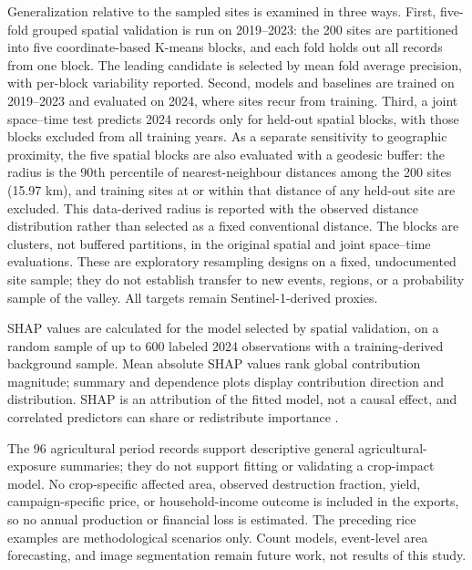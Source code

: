 \documentclass[pdflatex,sn-mathphys,Numbered]{sn-jnl}
\begin{document}
Generalization relative to the sampled sites is examined in three ways. First, five-fold grouped spatial validation is run on 2019--2023: the 200 sites are partitioned into five coordinate-based K-means blocks, and each fold holds out all records from one block. The leading candidate is selected by mean fold average precision, with per-block variability reported. Second, models and baselines are trained on 2019--2023 and evaluated on 2024, where sites recur from training. Third, a joint space--time test predicts 2024 records only for held-out spatial blocks, with those blocks excluded from all training years. As a separate sensitivity to geographic proximity, the five spatial blocks are also evaluated with a geodesic buffer: the radius is the 90th percentile of nearest-neighbour distances among the 200 sites (15.97 km), and training sites at or within that distance of any held-out site are excluded. This data-derived radius is reported with the observed distance distribution rather than selected as a fixed conventional distance. The blocks are clusters, not buffered partitions, in the original spatial and joint space--time evaluations. These are exploratory resampling designs on a fixed, undocumented site sample; they do not establish transfer to new events, regions, or a probability sample of the valley. All targets remain Sentinel-1-derived proxies.

SHAP values are calculated for the model selected by spatial validation, on a random sample of up to 600 labeled 2024 observations with a training-derived background sample. Mean absolute SHAP values rank global contribution magnitude; summary and dependence plots display contribution direction and distribution. SHAP is an attribution of the fitted model, not a causal effect, and correlated predictors can share or redistribute importance \cite{lundberg2017}.

The 96 agricultural period records support descriptive general agricultural-exposure summaries; they do not support fitting or validating a crop-impact model. No crop-specific affected area, observed destruction fraction, yield, campaign-specific price, or household-income outcome is included in the exports, so no annual production or financial loss is estimated. The preceding rice examples are methodological scenarios only. Count models, event-level area forecasting, and image segmentation remain future work, not results of this study.
\end{document}

